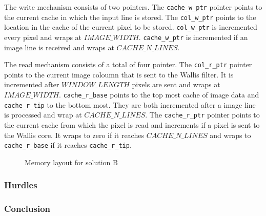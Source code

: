 The write mechanism consists of two pointers. The \texttt{cache\_w\_ptr} pointer
points to the current cache in which the input line is stored. The 
\texttt{col\_w\_ptr} points to the location in the cache of the current pixel to
be stored. \texttt{col\_w\_ptr} is incremented every pixel and wraps at
$IMAGE\_WIDTH$. \texttt{cache\_w\_ptr} is incremented if an image line is
received and wraps at $CACHE\_N\_LINES$.

The read mechanism consists of a total of four pointer. The \texttt{col\_r\_ptr}
pointer points to the current image coloumn that is sent to the Wallis filter.
It is incremented after $WINDOW\_LENGTH$ pixels are sent and wraps at
$IMAGE\_WIDTH$. \texttt{cache\_r\_base} points to the top most cache of image
data and \texttt{cache\_r\_tip} to the bottom most. They are both incremented
after a image line is processed and wrap at $CACHE\_N\_LINES$. The 
\texttt{cache\_r\_ptr} pointer points to the current cache from which the pixel
is read and increments if a pixel is sent to the Wallis core. It wraps to zero
if it reaches $CACHE\_N\_LINES$ and wraps to \texttt{cache\_r\_base} if it
reaches \texttt{cache\_r\_tip}. 

\begin{figure}[tb!]
    \centering
    \begin{adjustbox}{max width=\textwidth}
        
    \end{adjustbox}
    \caption{Memory layout for solution B}
    \label{fig:solbmemlayout}
\end{figure}





\subsubsection*{Hurdles}
% 
\subsubsection*{Conclusion}


